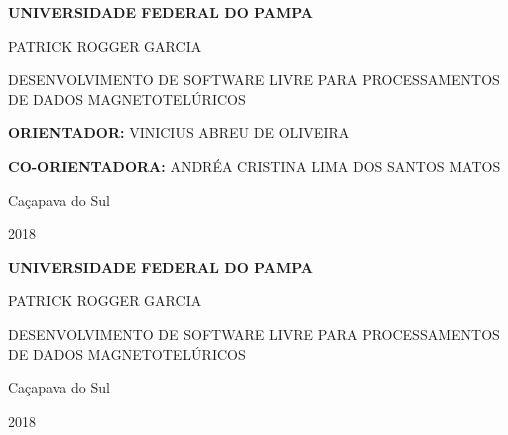 
\newpage
    \begin{center}
      {\bf
	  \large UNIVERSIDADE FEDERAL DO PAMPA

	      \vspace{150pt}
	  
	      PATRICK ROGGER GARCIA
	  
	  
	  \vfill
	      \large DESENVOLVIMENTO DE SOFTWARE LIVRE PARA PROCESSAMENTOS DE DADOS MAGNETOTELÚRICOS
	  \vfill}
      

	  {\bf
	      ORIENTADOR:}
	      VINICIUS ABREU DE OLIVEIRA
	   
	  {\bf
	      CO-ORIENTADORA:}
	      ANDRÉA CRISTINA LIMA DOS SANTOS MATOS 
	      \vspace{200pt}
	  
      \bf{
	  Caçapava do Sul
 
	  2018}
\end{center}


\newpage
    \begin{center}
      {\bf
	  \large UNIVERSIDADE FEDERAL DO PAMPA

	      \vspace{150pt}
	  
	      PATRICK ROGGER GARCIA
	  
	  
	  \vfill
	      \large DESENVOLVIMENTO DE SOFTWARE LIVRE PARA PROCESSAMENTOS DE DADOS MAGNETOTELÚRICOS
	  \vfill}
      

	  
	  
      \bf{
	  Caçapava do Sul
 
	  2018}
\end{center}
